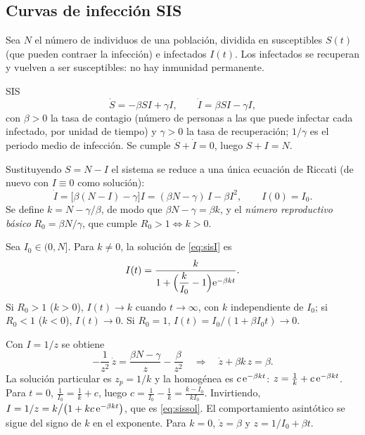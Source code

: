 \documentclass[11pt,twoside]{article}
\begin{document}
\subsection{Curvas de infección SIS}

Sea $N$ el número de individuos de una población, dividida en susceptibles $S(t)$ (que pueden contraer la infección) e
infectados $I(t)$. Los infectados se recuperan y vuelven a ser susceptibles: no hay inmunidad permanente.

\begin{modelo}{SIS}
\begin{equation}\label{eq:sis}
\dot S=-\beta SI+\gamma I,\qquad\dot I=\beta SI-\gamma I,
\end{equation}
con $\beta>0$ la tasa de contagio (número de personas a las que puede infectar cada infectado, por unidad de tiempo) y
$\gamma>0$ la tasa de recuperación; $1/\gamma$ es el periodo medio de infección. Se cumple $\dot S+\dot I=0$, luego $S+I=N$.
\end{modelo}

Sustituyendo $S=N-I$ el sistema se reduce a una única ecuación de Riccati (de nuevo con $I\equiv0$ como solución):
\begin{equation}\label{eq:sisI}
\dot I=\big[\beta(N-I)-\gamma\big]I=(\beta N-\gamma)\,I-\beta I^2,\qquad I(0)=I_0.
\end{equation}
Se define $k=N-\gamma/\beta$, de modo que $\beta N-\gamma=\beta k$, y el \emph{número reproductivo básico} $R_0=\beta N/\gamma$,
que cumple $R_0>1\iff k>0$.

\begin{teorema}\label{teo:sis}
Sea $I_0\in(0,N]$. Para $k\neq0$, la solución de \eqref{eq:sisI} es
\begin{equation}\label{eq:sissol}
I(t)=\frac{k}{1+\Big(\dfrac{k}{I_0}-1\Big)\mathrm{e}^{-\beta kt}}.
\end{equation}
Si $R_0>1$ ($k>0$), $I(t)\to k$ cuando $t\to\infty$, con $k$ independiente de $I_0$; si $R_0<1$ ($k<0$), $I(t)\to0$. Si
$R_0=1$, $I(t)=I_0/(1+\beta I_0t)\to0$.
\end{teorema}

\begin{demostracion}
Con $I=1/z$ se obtiene
\begin{equation*}
-\frac1{z^2}\,\dot z=\frac{\beta N-\gamma}{z}-\frac{\beta}{z^2}\quad\Longrightarrow\quad\dot z+\beta k\,z=\beta.
\end{equation*}
La solución particular es $z_p=1/k$ y la homogénea es $c\,\mathrm{e}^{-\beta kt}$: $z=\frac1k+c\,\mathrm{e}^{-\beta kt}$. Para $t=0$,
$\frac1{I_0}=\frac1k+c$, luego $c=\frac1{I_0}-\frac1k=\frac{k-I_0}{kI_0}$. Invirtiendo, $I=1/z=k\big/\big(1+kc\,\mathrm{e}^{-\beta kt}\big)$,
que es \eqref{eq:sissol}. El comportamiento asintótico se sigue del signo de $k$ en el exponente. Para $k=0$, $\dot z=\beta$ y
$z=1/I_0+\beta t$.
\end{demostracion}
\end{document}
